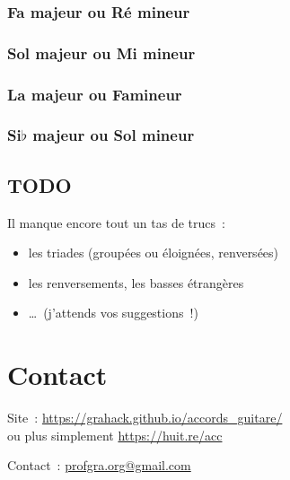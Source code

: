 \documentclass[11pt]{article}
\begin{document}

\subsubsection{Fa majeur ou Ré mineur}


\subsubsection{Sol majeur ou Mi mineur}


\subsubsection{La majeur ou Fa\shrp mineur}


\subsubsection{Si$\flat$ majeur ou Sol mineur}


\subsection{TODO}


Il manque encore tout un tas de trucs~:

\begin{itemize}
\item les triades (groupées ou éloignées, renversées)
\item les renversements, les basses étrangères
\item \ldots~(j’attends vos suggestions~!)
\end{itemize}

\section{Contact} \label{contact}

\setlength{\parindent}{0pt}

Site~: \url{https://grahack.github.io/accords_guitare/} \\
ou plus simplement \url{https://huit.re/acc}

Contact~: \url{profgra.org@gmail.com}
\end{document}
